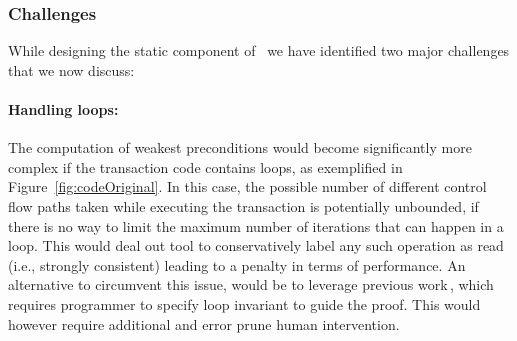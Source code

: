 

\subsubsection{Challenges}
While designing the static component of \tool\ we have identified two major
challenges that we now discuss:

\paragraph{Handling loops: } The computation of weakest preconditions would become
significantly more complex if the transaction code contains loops, as exemplified in Figure~\ref{fig:codeOriginal}.
In this case, the possible number of different control flow paths taken 
while executing the transaction is potentially unbounded, 
if there is no way to limit the maximum number of iterations 
that can happen in a loop. This would deal out tool to conservatively label any such 
operation as read (i.e., strongly consistent) leading to a penalty in terms of performance.
An alternative to circumvent this issue, would be to leverage previous work\,\cite{Kuncak2007Jahob}, which 
requires programmer to specify loop invariant to guide the proof. This would however require
additional and error prune human intervention.

